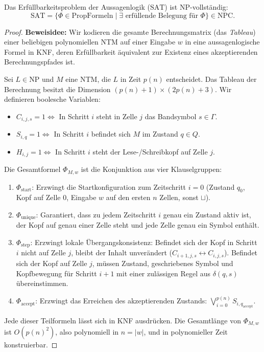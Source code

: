 \begin{theorem}
    Das Erfüllbarkeitsproblem der Aussagenlogik ($\mathrm{SAT}$) ist NP-vollständig:
    \[
        \mathrm{SAT} = \{\Phi \in \mathrm{PropFormeln} \mid \exists \text{ erfüllende Belegung für } \Phi\} \in \mathrm{NPC}.
    \]
\end{theorem}

\begin{proof}
    \textbf{Beweisidee:} Wir kodieren die gesamte Berechnungsmatrix (das \emph{Tableau}) einer beliebigen polynomiellen NTM auf einer Eingabe $w$ in eine aussagenlogische Formel in KNF, deren Erfüllbarkeit äquivalent zur Existenz eines akzeptierenden Berechnungspfades ist.
    
    Sei $L \in \mathrm{NP}$ und $M$ eine NTM, die $L$ in Zeit $p(n)$ entscheidet. Das Tableau der Berechnung besitzt die Dimension $(p(n)+1) \times (2p(n)+3)$.
    Wir definieren boolesche Variablen:
    \begin{itemize}
        \item $C_{i, j, s} = 1 \iff$ In Schritt $i$ steht in Zelle $j$ das Bandsymbol $s \in \Gamma$.
        \item $S_{i, q} = 1 \iff$ In Schritt $i$ befindet sich $M$ im Zustand $q \in Q$.
        \item $H_{i, j} = 1 \iff$ In Schritt $i$ steht der Lese-/Schreibkopf auf Zelle $j$.
    \end{itemize}
    Die Gesamtformel $\Phi_{M, w}$ ist die Konjunktion aus vier Klauselgruppen:
    \begin{enumerate}
        \item $\Phi_{\mathrm{start}}$: Erzwingt die Startkonfiguration zum Zeitschritt $i=0$ (Zustand $q_0$, Kopf auf Zelle 0, Eingabe $w$ auf den ersten $n$ Zellen, sonst $\sqcup$).
        \item $\Phi_{\mathrm{unique}}$: Garantiert, dass zu jedem Zeitschritt $i$ genau ein Zustand aktiv ist, der Kopf auf genau einer Zelle steht und jede Zelle genau ein Symbol enthält.
        \item $\Phi_{\mathrm{step}}$: Erzwingt lokale Übergangskonsistenz:
        Befindet sich der Kopf in Schritt $i$ nicht auf Zelle $j$, bleibt der Inhalt unverändert ($C_{i+1, j, s} \leftrightarrow C_{i, j, s}$). Befindet sich der Kopf auf Zelle $j$, müssen Zustand, geschriebenes Symbol und Kopfbewegung für Schritt $i+1$ mit einer zulässigen Regel aus $\delta(q, s)$ übereinstimmen.
        \item $\Phi_{\mathrm{accept}}$: Erzwingt das Erreichen des akzeptierenden Zustands: $\bigvee_{i=0}^{p(n)} S_{i, q_{\mathrm{accept}}}$.
    \end{enumerate}
    Jede dieser Teilformeln lässt sich in KNF ausdrücken. Die Gesamtlänge von $\Phi_{M, w}$ ist $O(p(n)^2)$, also polynomiell in $n = |w|$, und in polynomieller Zeit konstruierbar.
\end{proof}

